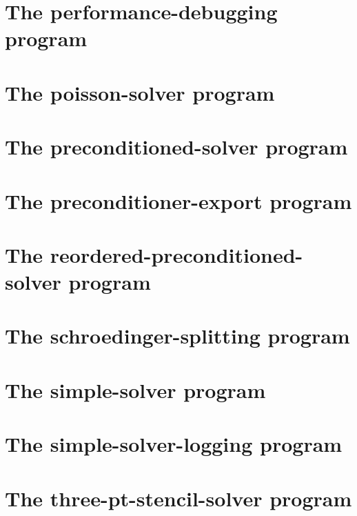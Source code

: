\let\mypdfximage\pdfximage\def\pdfximage{\immediate\mypdfximage}\documentclass[twoside]{book}
\newcommand{\+}{\discretionary{\mbox{\scriptsize$\hookleftarrow$}}{}{}}
\begin{document}
\chapter{The performance-\/debugging program}
\label{performance_debugging}

\chapter{The poisson-\/solver program}
\label{poisson_solver}

\chapter{The preconditioned-\/solver program}
\label{preconditioned_solver}

\chapter{The preconditioner-\/export program}
\label{preconditioner_export}

\chapter{The reordered-\/preconditioned-\/solver program}
\label{reordered_preconditioned_solver}

\chapter{The schroedinger-\/splitting program}
\label{schroedinger_splitting}

\chapter{The simple-\/solver program}
\label{simple_solver}

\chapter{The simple-\/solver-\/logging program}
\label{simple_solver_logging}

\chapter{The three-\/pt-\/stencil-\/solver program}
\label{three_pt_stencil_solver}

\end{document}
